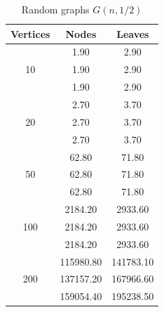 \begin{table}[h]
    \centering
    \begin{tabular}{ccc}
    \toprule
    Vertices & Nodes & Leaves \\
    \midrule
    \multirow{3}{*}{10} & 1.90 & 2.90 \\
     & 1.90 & 2.90 \\
     & 1.90 & 2.90 \\
    \cmidrule(lr){1-3}
    \multirow{3}{*}{20} & 2.70 & 3.70 \\
     & 2.70 & 3.70 \\
     & 2.70 & 3.70 \\
    \cmidrule(lr){1-3}
    \multirow{3}{*}{50} & 62.80 & 71.80 \\
     & 62.80 & 71.80 \\
     & 62.80 & 71.80 \\
    \cmidrule(lr){1-3}
    \multirow{3}{*}{100} & 2184.20 & 2933.60 \\
     & 2184.20 & 2933.60 \\
     & 2184.20 & 2933.60 \\
    \cmidrule(lr){1-3}
    \multirow{3}{*}{200} & 115980.80 & 141783.10 \\
     & 137157.20 & 167966.60 \\
     & 159054.40 & 195238.50 \\
    \bottomrule
    \end{tabular}
    \caption{Random graphs $G(n, 1/2)$}
\end{table}
